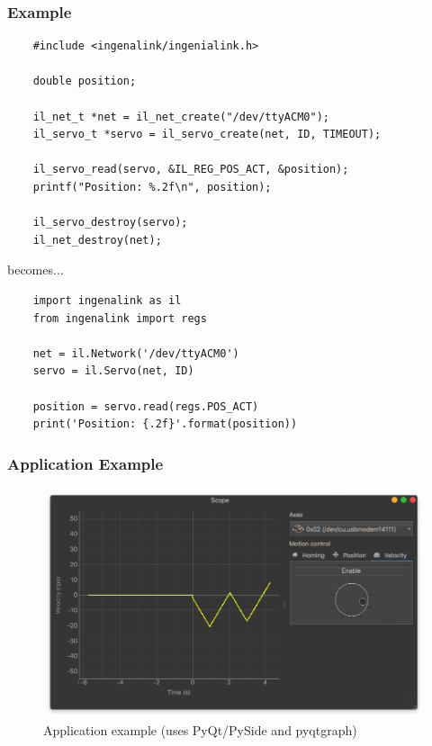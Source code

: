 \documentclass[handout]{beamer}
\begin{document}
\begin{frame}[fragile]
  \frametitle{Example}

  \begin{verbatim}
    #include <ingenalink/ingenialink.h>

    double position;

    il_net_t *net = il_net_create("/dev/ttyACM0");
    il_servo_t *servo = il_servo_create(net, ID, TIMEOUT);

    il_servo_read(servo, &IL_REG_POS_ACT, &position);
    printf("Position: %.2f\n", position);

    il_servo_destroy(servo);
    il_net_destroy(net);
  \end{verbatim}

  becomes...

  \begin{verbatim}
    import ingenalink as il
    from ingenalink import regs

    net = il.Network('/dev/ttyACM0')
    servo = il.Servo(net, ID)

    position = servo.read(regs.POS_ACT)
    print('Position: {.2f}'.format(position))
  \end{verbatim}
\end{frame}

\begin{frame}
  \frametitle{Application Example}

  \begin{figure}
    \centering
    \includegraphics[scale=0.3]{example-scope.png}
    \caption{Application example (uses PyQt/PySide and pyqtgraph)}
  \end{figure}
\end{frame}
\end{document}

